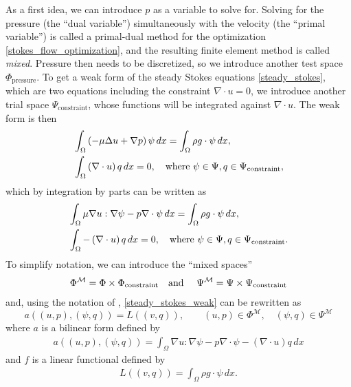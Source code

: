 \newcommand{\trialconstraint}{{\Psi_{\text{constraint}}}}
\newcommand{\testpressure}{{\Phi_{\text{pressure}}}}
As a first idea, we can introduce $p$ as a variable to solve for. Solving for the pressure (the ``dual variable'') simultaneously with the velocity
(the ``primal variable'')
is called a primal-dual method for the optimization \eqref{stokes_flow_optimization}, and the resulting finite element method is called \textit{mixed}.
Pressure then needs to be discretized, so we introduce another test space $\testpressure$.
To get a weak form of the steady Stokes equations \eqref{steady_stokes}, which are two equations including the constraint $\nabla\cdot u = 0$, we introduce
another trial space $\trialconstraint$, whose functions will be integrated against $\nabla\cdot u$. The weak form is then
\begin{equation*}
\begin{split}
    &\int_\om \left(-\mu\Delta u + \nabla p\right)\psi\,dx = \int_\Omega \rho g\cdot\psi\,dx,\\
    &\int_\om \left(\nabla\cdot u\right) q\,dx = 0, \quad\text{where $\psi \in \Psi, q \in \trialconstraint$},
\end{split}
\end{equation*}
which by integration by parts can be written as
\begin{equation}\label{steady_stokes_weak}
\begin{split}
    &\int_\om \mu\nabla u : \nabla \psi - p\nabla\cdot \psi\,dx = \int_\om \rho g\cdot \psi\,dx,\\
    &\int_\om -\left(\nabla\cdot u\right)q\,dx = 0, \quad\text{where $\psi \in \Psi, q \in \trialconstraint$}.
\end{split}
\end{equation}
To simplify notation, we can introduce the ``mixed spaces''
\begin{align*}
    \Phi^\mathcal{M} = \Phi \times \Phi_{\text{constraint}}
    \text{\quad and \quad}
    \Psi^\mathcal{M} = \Psi \times \Psi_{\text{constraint}}
\end{align*}
and, using the notation of \cite{taylor_hood_fenics}, \eqref{steady_stokes_weak} can be rewritten as
\begin{equation}\label{steady_stokes_bilinear_form}
    a((u, p), (\psi, q)) = L((v, q)), \quad\quad (u,p) \in \Phi^\mathcal{M},\quad (\psi, q) \in \Psi^\mathcal{M}
\end{equation}
where $a$ is a bilinear form defined by
\begin{align*}
    a((u, p), (\psi, q)) = \int_\Omega \nabla u : \nabla\psi - p\nabla\cdot \psi - \left(\nabla\cdot u\right)q\,dx
\end{align*}
and $f$ is a linear functional defined by
\begin{align*}
    L((v, q)) = \int_\Omega \rho g\cdot\psi\,dx.
\end{align*}

